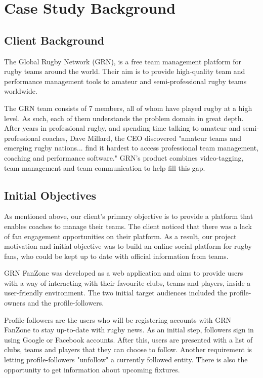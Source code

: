 \documentclass{l3proj}
\begin{document}
\section{Case Study Background}
\label{sec:background}

\subsection{Client Background}

The Global Rugby Network (GRN), is a free team management platform
 for rugby teams around the world. Their aim is to provide high-quality
 team and performance management tools to amateur and semi-professional 
 rugby teams worldwide. 

The GRN team consists of 7 members, all of whom have played rugby at a high level. 
 As such, each of them understands the problem domain in great depth. After years in
 professional rugby, and spending time talking to amateur and semi-professional coaches, 
 Dave Millard, the CEO discovered "amateur teams and emerging rugby nations... find it 
 hardest to access professional team management, coaching and performance software." 
 GRN's product combines video-tagging, team management and team communication to help 
 fill this gap.


\subsection{Initial Objectives}
As mentioned above, our client's primary objective is to provide a platform that
 enables coaches to manage their teams.  The client noticed that there was a lack of
 fan engagement opportunities on their platform. As a result, our project motivation
 and initial objective was to build an online social platform for rugby fans, who could
 be kept up to date with official information from teams.

GRN FanZone was developed as a web application and aims to provide users with a way of
 interacting with their favourite clubs, teams and players, inside a user-friendly
 environment. The two initial target audiences included the profile-owners and the
 profile-followers.

Profile-followers are the users who will be registering accounts with GRN FanZone to
 stay up-to-date with rugby news. As an initial step, followers sign in using Google or
 Facebook accounts. After this, users are presented with a list of clubs, teams and players
 that they can choose to follow. Another requirement is letting profile-followers "unfollow"
 a currently followed entity. There is also the opportunity to get information about
 upcoming fixtures.
\end{document}
